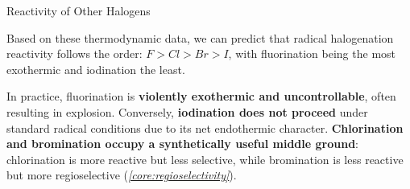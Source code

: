 \documentclass[10pt]{article}
\begin{document}
\begin{core}{Reactivity of Other Halogens}
\begin{itemize}
    \end{itemize}

    Based on these thermodynamic data, we can predict that radical halogenation reactivity follows the order: $F > Cl > Br > I$, with fluorination being the most exothermic and iodination the least.

    In practice, fluorination is \textbf{violently exothermic and uncontrollable}, often resulting in explosion. Conversely, \textbf{iodination does not proceed} under standard radical conditions due to its net endothermic character. \textbf{Chlorination and bromination occupy a synthetically useful middle ground}: chlorination is more reactive but less selective, while bromination is less reactive but more regioselective (\textit{\autoref{core:regioselectivity}}).


  \end{core}
\end{document}
